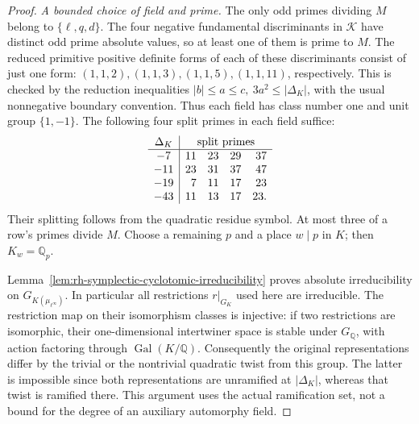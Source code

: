 \begin{proof}
\emph{A bounded choice of field and prime.}
The only odd primes dividing \(M\) belong to \(\{\ell,q,d\}\).
The four negative fundamental discriminants in \(\mathcal K\)
have distinct odd prime absolute values, so at least one of
them is prime to \(M\). The reduced primitive positive definite
forms of each of these discriminants consist of just one form:
\((1,1,2),(1,1,3),(1,1,5),(1,1,11)\), respectively. This is
checked by the reduction inequalities
\(|b|\le a\le c,\ 3a^2\le |\Delta_K|\), with the usual
nonnegative boundary convention. Thus each field has class
number one and unit group \(\{1,-1\}\).
The following four split primes in each field suffice:
\[
 \begin{array}{c|rrrr}
 \Delta_K&\multicolumn{4}{c}{\text{split primes}}\\ \hline
 -7&11&23&29&37\\
 -11&23&31&37&47\\
 -19&7&11&17&23\\
 -43&11&13&17&23 .
 \end{array}
\]
Their splitting follows from the quadratic residue symbol.
At most three of a row's primes divide \(M\).
Choose a remaining \(p\) and a place \(w\mid p\) in \(K\);
then \(K_w=\mathbb Q_p\).

Lemma~\ref{lem:rh-symplectic-cyclotomic-irreducibility} proves
absolute irreducibility on \(G_{K(\mu_{\ell^\infty})}\).
In particular all restrictions \(r|_{G_K}\) used here are
irreducible. The restriction map on their isomorphism classes
is injective: if two restrictions are isomorphic, their
one-dimensional intertwiner space is stable under \(G_{\mathbb Q}\),
with action factoring through \(\operatorname{Gal}(K/\mathbb Q)\).
Consequently the original representations differ by the trivial
or the nontrivial quadratic twist from this group. The latter
is impossible since both representations are unramified at
\(|\Delta_K|\), whereas that twist is ramified there. This
argument uses the actual ramification set, not a bound for
the degree of an auxiliary automorphy field.


\end{proof}
